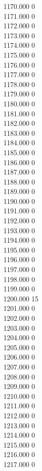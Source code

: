 { 1170.000	0 \\
 1171.000	0 \\
 1172.000	0 \\
 1173.000	0 \\
 1174.000	0 \\
 1175.000	0 \\
 1176.000	0 \\
 1177.000	0 \\
 1178.000	0 \\
 1179.000	0 \\
 1180.000	0 \\
 1181.000	0 \\
 1182.000	0 \\
 1183.000	0 \\
 1184.000	0 \\
 1185.000	0 \\
 1186.000	0 \\
 1187.000	0 \\
 1188.000	0 \\
 1189.000	0 \\
 1190.000	0 \\
 1191.000	0 \\
 1192.000	0 \\
 1193.000	0 \\
 1194.000	0 \\
 1195.000	0 \\
 1196.000	0 \\
 1197.000	0 \\
 1198.000	0 \\
 1199.000	0 \\
 1200.000	15 \\
 1201.000	0 \\
 1202.000	0 \\
 1203.000	0 \\
 1204.000	0 \\
 1205.000	0 \\
 1206.000	0 \\
 1207.000	0 \\
 1208.000	0 \\
 1209.000	0 \\
 1210.000	0 \\
 1211.000	0 \\
 1212.000	0 \\
 1213.000	0 \\
 1214.000	0 \\
 1215.000	0 \\
 1216.000	0 \\
 1217.000	0 \\
}
